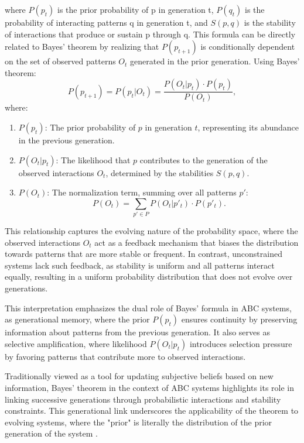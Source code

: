 \documentclass[entropy,article,submit,pdftex,oneauthor]{Definitions/mdpi}
\begin{document}
where \( P(p_t) \) is the prior probability of p in generation t, \( P(q_t) \) is the probability of interacting patterns q in generation t, and \( S(p, q) \) is the stability of interactions that produce or sustain p through q. This formula can be directly related to Bayes' theorem by realizing that \( P(p_{t+1}) \) is conditionally dependent on the set of observed patterns \( O_t \) generated in the prior generation. Using Bayes' theorem:
\begin{equation}
P(p_{t+1}) = P(p_t | O_t) = \frac{P(O_t | p_t) \cdot P(p_t)}{P(O_t)},
\end{equation}
where:
\begin{enumerate}
    \item[] \( P(p_t) \): The prior probability of \( p \) in generation \( t \), representing its abundance in the previous generation.
    \item[] \( P(O_t | p_t) \): The likelihood that \( p \) contributes to the generation of the observed interactions \( O_t \), determined by the stabilities \( S(p, q) \).
    \item[] \( P(O_t) \): The normalization term, summing over all patterns \( p' \):
    \[
    P(O_t) = \sum_{p' \in P} P(O_t | p'_t) \cdot P(p'_t).
    \]
\end{enumerate}

This relationship captures the evolving nature of the probability space, where the observed interactions \( O_t \) act as a feedback mechanism that biases the distribution towards patterns that are more stable or frequent. In contrast, unconstrained systems lack such feedback, as stability is uniform and all patterns interact equally, resulting in a uniform probability distribution that does not evolve over generations. 

This interpretation emphasizes the dual role of Bayes' formula in ABC systems, as generational memory, where the prior \( P(p_t) \) ensures continuity by preserving information about patterns from the previous generation.
It also serves as selective amplification, where likelihood \( P(O_t | p_t) \) introduces selection pressure by favoring patterns that contribute more to observed interactions. 

Traditionally viewed as a tool for updating subjective beliefs based on new information, Bayes’ theorem in the context of ABC systems highlights its role in linking successive generations through probabilistic interactions and stability constraints. This generational link underscores the applicability of the theorem to evolving systems, where the "prior" is literally the distribution of the prior generation of the system \cite{le2020equation}.
\end{document}
